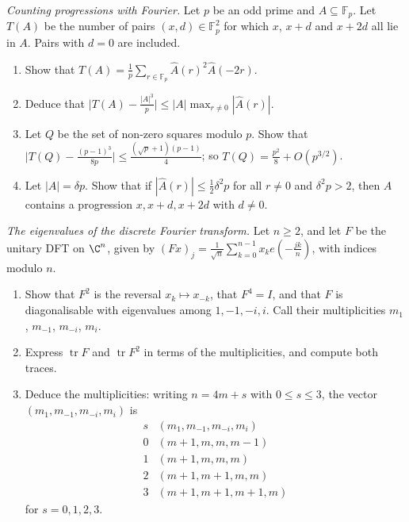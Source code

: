 \begin{exercise}[$\star\star$]\label{pb:apcount}
\emph{Counting progressions with Fourier.} Let $p$ be an odd prime and $A\subseteq\mathbb F_p$. Let $T(A)$ be the number of pairs $(x,d)\in\mathbb F_p^2$ for which $x$, $x+d$ and $x+2d$ all lie in $A$. Pairs with $d=0$ are included.
\begin{enumerate}[label=(\alph*)]
\item Show that $T(A)=\frac1p\sum_{r\in\mathbb F_p}\hat A(r)^2\hat A(-2r)$.
\item Deduce that $\bigl|T(A)-\frac{|A|^3}p\bigr|\le|A|\max_{r\ne0}|\hat A(r)|$.
\item Let $Q$ be the set of non-zero squares modulo $p$. Show that $\bigl|T(Q)-\frac{(p-1)^3}{8p}\bigr|\le\frac{(\sqrt p+1)(p-1)}4$; so $T(Q)=\frac{p^2}8+O(p^{3/2})$.
\item Let $|A|=\delta p$. Show that if $|\hat A(r)|\le\frac12\delta^2p$ for all $r\ne0$ and $\delta^2p>2$, then $A$ contains a
progression $x,x+d,x+2d$ with $d\ne0$.
\end{enumerate}
\end{exercise}

\begin{exercise}[$\star\star\star$]\label{pb:dftspectrum}
\emph{The eigenvalues of the discrete Fourier transform.} Let $n\ge2$, and let $F$ be the unitary DFT on $\C^n$, given by $(Fx)_j=\frac1{\sqrt n}\sum_{k=0}^{n-1}x_ke(-\frac{jk}n)$, with indices modulo $n$.
\begin{enumerate}[label=(\alph*)]
\item Show that $F^2$ is the reversal $x_k\mapsto x_{-k}$, that $F^4=I$, and that $F$ is diagonalisable with eigenvalues among
$1,-1,-i,i$. Call their multiplicities $m_1$, $m_{-1}$, $m_{-i}$, $m_i$.
\item Express $\operatorname{tr}F$ and $\operatorname{tr}F^2$ in terms of the multiplicities, and compute both traces.
\item Deduce the multiplicities: writing $n=4m+s$ with $0\le s\le3$, the vector $(m_1,m_{-1},m_{-i},m_i)$ is
\[
\begin{array}{c|c}
s&(m_1,m_{-1},m_{-i},m_i)\\\hline
0&(m+1,m,m,m-1)\\
1&(m+1,m,m,m)\\
2&(m+1,m+1,m,m)\\
3&(m+1,m+1,m+1,m)
\end{array}
\]
for $s=0,1,2,3$.
\end{enumerate}
\end{exercise}

